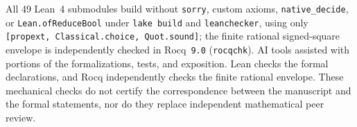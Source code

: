\begin{remark}
\label{rem:reproducibility}
All 49 Lean~4 submodules build without \texttt{sorry}, custom axioms, \texttt{native\_decide}, or \texttt{Lean.ofReduceBool} under \texttt{lake build} and \texttt{leanchecker}, using only \texttt{[propext, Classical.choice, Quot.sound]}; the finite rational signed-square envelope is independently checked in Rocq~\texttt{9.0} (\texttt{rocqchk}). AI tools assisted with portions of the formalizations, tests, and exposition. Lean checks the formal declarations, and Rocq independently checks the finite rational envelope. These mechanical checks do not certify the correspondence between the manuscript and the formal statements, nor do they replace independent mathematical peer review.
\end{remark}
